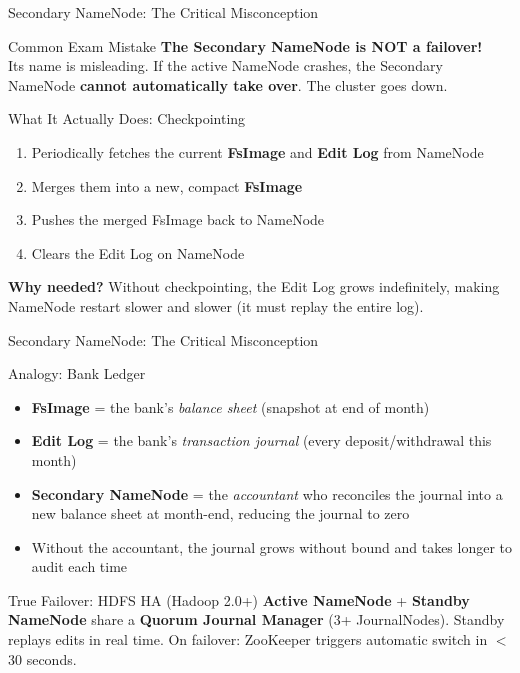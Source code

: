 \documentclass[aspectratio=169,10pt]{beamer}
\begin{document}
\begin{frame}{Secondary NameNode: The Critical Misconception}
 
      \begin{alertblock}{Common Exam Mistake}
        \textbf{The Secondary NameNode is NOT a failover!}\\[4pt]
        Its name is misleading.  If the active NameNode crashes, the Secondary NameNode \textbf{cannot automatically take over}.  The cluster goes down.
      \end{alertblock}
      \vspace{6pt}
      \begin{block}{What It Actually Does: Checkpointing}
        \begin{enumerate}
          \item Periodically fetches the current \textbf{FsImage} and \textbf{Edit Log} from NameNode
          \item Merges them into a new, compact \textbf{FsImage}
          \item Pushes the merged FsImage back to NameNode
          \item Clears the Edit Log on NameNode
        \end{enumerate}
        \vspace{4pt}
        \textbf{Why needed?}  Without checkpointing, the Edit Log grows indefinitely, making NameNode restart slower and slower (it must replay the entire log).
      \end{block}

    
\end{frame}

\begin{frame}{Secondary NameNode: The Critical Misconception}
  
      \begin{exampleblock}{Analogy: Bank Ledger}
        \small
        \begin{itemize}
          \item \textbf{FsImage} = the bank's \emph{balance sheet} (snapshot at end of month)
          \item \textbf{Edit Log} = the bank's \emph{transaction journal} (every deposit/withdrawal this month)
          \item \textbf{Secondary NameNode} = the \emph{accountant} who reconciles the journal into a new balance sheet at month-end, reducing the journal to zero
          \item Without the accountant, the journal grows without bound and takes longer to audit each time
        \end{itemize}
      \end{exampleblock}
      \vspace{4pt}
      \begin{block}{True Failover: HDFS HA (Hadoop 2.0+)}
        \small \textbf{Active NameNode} + \textbf{Standby NameNode} share a \textbf{Quorum Journal Manager} (3+ JournalNodes).  Standby replays edits in real time.  On failover: ZooKeeper triggers automatic switch in $<$30 seconds.
      \end{block}
  
\end{frame}
\end{document}
